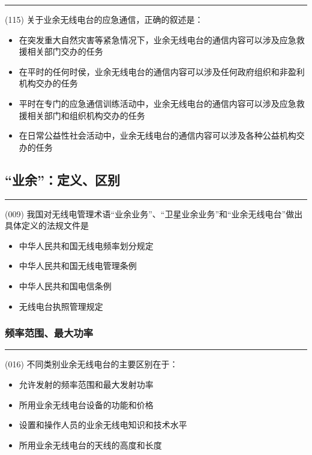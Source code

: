 \documentclass[twocolumn,hyperref,UTF8]{ctexart}  %
\begin{document}
\noindent\rule{0.5\textwidth}{1pt}
\heiti (115) 关于业余无线电台的应急通信，正确的叙述是： \songti {\color{gray} [LK0055] }
\begin{itemize}
	\item  在突发重大自然灾害等紧急情况下，业余无线电台的通信内容可以涉及应急救援相关部门交办的任务
	\item  在平时的任何时侯，业余无线电台的通信内容可以涉及任何政府组织和非盈利机构交办的任务
	\item  平时在专门的应急通信训练活动中，业余无线电台的通信内容可以涉及应急救援相关部门和组织机构交办的任务
	\item  在日常公益性社会活动中，业余无线电台的通信内容可以涉及各种公益机构交办的任务
\end{itemize}








\clearpage
\subsection{“业余”：定义、区别}


\noindent\rule{0.5\textwidth}{1pt}
\heiti (009) 我国对无线电管理术语“业余业务”、“卫星业余业务”和“业余无线电台”做出具体定义的法规文件是  \songti {\color{gray} [LK0007] }
\begin{itemize}
	\item  中华人民共和国无线电频率划分规定
	\item  中华人民共和国无线电管理条例
	\item  中华人民共和国电信条例
	\item  无线电台执照管理规定
\end{itemize}


\subsubsection{频率范围、最大功率}


\noindent\rule{0.5\textwidth}{1pt}
\heiti (016) 不同类别业余无线电台的主要区别在于： \songti {\color{gray} [LK0013] }
\begin{itemize}
	\item  允许发射的频率范围和最大发射功率
	\item  所用业余无线电台设备的功能和价格
	\item  设置和操作人员的业余无线电知识和技术水平
	\item  所用业余无线电台的天线的高度和长度
\end{itemize}
\end{document}
